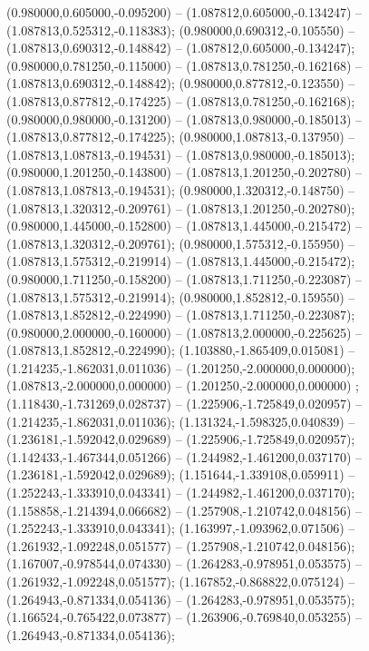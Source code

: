  (0.980000,0.605000,-0.095200) -- (1.087812,0.605000,-0.134247) -- (1.087813,0.525312,-0.118383);
 (0.980000,0.690312,-0.105550) -- (1.087813,0.690312,-0.148842) -- (1.087812,0.605000,-0.134247);
 (0.980000,0.781250,-0.115000) -- (1.087813,0.781250,-0.162168) -- (1.087813,0.690312,-0.148842);
 (0.980000,0.877812,-0.123550) -- (1.087813,0.877812,-0.174225) -- (1.087813,0.781250,-0.162168);
 (0.980000,0.980000,-0.131200) -- (1.087813,0.980000,-0.185013) -- (1.087813,0.877812,-0.174225);
 (0.980000,1.087813,-0.137950) -- (1.087813,1.087813,-0.194531) -- (1.087813,0.980000,-0.185013);
 (0.980000,1.201250,-0.143800) -- (1.087813,1.201250,-0.202780) -- (1.087813,1.087813,-0.194531);
 (0.980000,1.320312,-0.148750) -- (1.087813,1.320312,-0.209761) -- (1.087813,1.201250,-0.202780);
 (0.980000,1.445000,-0.152800) -- (1.087813,1.445000,-0.215472) -- (1.087813,1.320312,-0.209761);
 (0.980000,1.575312,-0.155950) -- (1.087813,1.575312,-0.219914) -- (1.087813,1.445000,-0.215472);
 (0.980000,1.711250,-0.158200) -- (1.087813,1.711250,-0.223087) -- (1.087813,1.575312,-0.219914);
 (0.980000,1.852812,-0.159550) -- (1.087813,1.852812,-0.224990) -- (1.087813,1.711250,-0.223087);
 (0.980000,2.000000,-0.160000) -- (1.087813,2.000000,-0.225625) -- (1.087813,1.852812,-0.224990);
 (1.103880,-1.865409,0.015081) -- (1.214235,-1.862031,0.011036) -- (1.201250,-2.000000,0.000000);
 (1.087813,-2.000000,0.000000) -- (1.201250,-2.000000,0.000000) ;
 (1.118430,-1.731269,0.028737) -- (1.225906,-1.725849,0.020957) -- (1.214235,-1.862031,0.011036);
 (1.131324,-1.598325,0.040839) -- (1.236181,-1.592042,0.029689) -- (1.225906,-1.725849,0.020957);
 (1.142433,-1.467344,0.051266) -- (1.244982,-1.461200,0.037170) -- (1.236181,-1.592042,0.029689);
 (1.151644,-1.339108,0.059911) -- (1.252243,-1.333910,0.043341) -- (1.244982,-1.461200,0.037170);
 (1.158858,-1.214394,0.066682) -- (1.257908,-1.210742,0.048156) -- (1.252243,-1.333910,0.043341);
 (1.163997,-1.093962,0.071506) -- (1.261932,-1.092248,0.051577) -- (1.257908,-1.210742,0.048156);
 (1.167007,-0.978544,0.074330) -- (1.264283,-0.978951,0.053575) -- (1.261932,-1.092248,0.051577);
 (1.167852,-0.868822,0.075124) -- (1.264943,-0.871334,0.054136) -- (1.264283,-0.978951,0.053575);
 (1.166524,-0.765422,0.073877) -- (1.263906,-0.769840,0.053255) -- (1.264943,-0.871334,0.054136);
